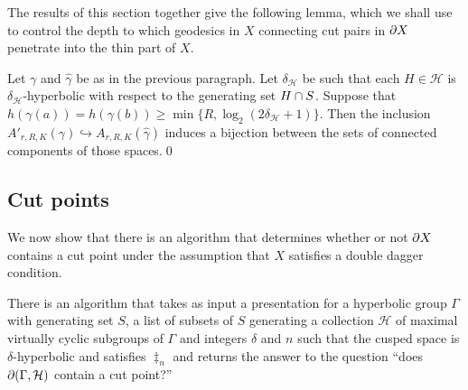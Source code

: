 The results of this section together give the following lemma, which we shall
use to control the depth to which geodesics in $X$ connecting cut pairs in
$\partial X$ penetrate into the thin part of $X$.

\begin{lem}\label{lem:geodesicsinhoroballs} Let $\gamma$ and $\hat\gamma$ be as
in the previous paragraph. Let $\delta_\mathcal{H}$ be such that each $H \in
\mathcal{H}$ is $\delta_\mathcal{H}$-hyperbolic with respect to the
generating set $H \cap S$.  Suppose that $h(\gamma(a)) =
h(\gamma(b)) \geq \min\{R, \log_2(2\delta_\mathcal{H} + 1)\}$. Then the
inclusion $A'_{r, R, K}(\gamma) \hookrightarrow A_{r, R, K}(\hat\gamma)$
induces a bijection between the sets of connected components of those
spaces.\qed\end{lem}

\subsection{Cut points}

We now show that there is an algorithm that determines whether or not
$\partial X$ contains a cut point under the assumption that $X$
satisfies a double dagger condition.

\begin{prop}\label{prop:cutpointscomputable} There is an algorithm that takes
as input a presentation for a hyperbolic group $\Gamma$ with generating set
$S$, a list of subsets of $S$ generating a collection $\mathcal{H}$ of maximal
virtually cyclic subgroups of $\Gamma$ and integers $\delta$ and $n$ such that the
cusped space is $\delta$-hyperbolic and satisfies $\ddag_n$ and returns the
answer to the question ``does $\partial(\Gamma, \mathcal{H})$ contain a cut
point?'' \end{prop}

